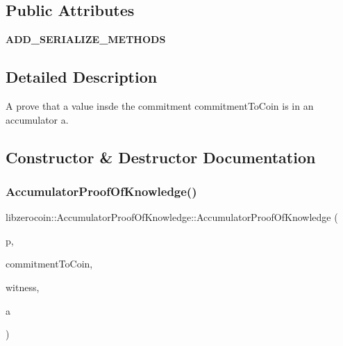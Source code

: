 \subsection*{Public Attributes}
\begin{DoxyCompactItemize}
\item 
\mbox{\label{classlibzerocoin_1_1_accumulator_proof_of_knowledge_aeebe0feccb9cc047063f279a369f0161}} 
{\bfseries A\+D\+D\+\_\+\+S\+E\+R\+I\+A\+L\+I\+Z\+E\+\_\+\+M\+E\+T\+H\+O\+DS}
\end{DoxyCompactItemize}


\subsection{Detailed Description}
A prove that a value insde the commitment commitment\+To\+Coin is in an accumulator a. 

\subsection{Constructor \& Destructor Documentation}
\mbox{\label{classlibzerocoin_1_1_accumulator_proof_of_knowledge_acce987e79e2498918495c3a7e8873810}} 
\subsubsection{\texorpdfstring{AccumulatorProofOfKnowledge()}{AccumulatorProofOfKnowledge()}}
{\footnotesize\ttfamily libzerocoin\+::\+Accumulator\+Proof\+Of\+Knowledge\+::\+Accumulator\+Proof\+Of\+Knowledge (\begin{DoxyParamCaption}\item[{const \mbox{\hyperlink{classlibzerocoin_1_1_accumulator_and_proof_params}{Accumulator\+And\+Proof\+Params}} $\ast$}]{p,  }\item[{const \mbox{\hyperlink{classlibzerocoin_1_1_commitment}{Commitment}} \&}]{commitment\+To\+Coin,  }\item[{const \mbox{\hyperlink{classlibzerocoin_1_1_accumulator_witness}{Accumulator\+Witness}} \&}]{witness,  }\item[{\mbox{\hyperlink{classlibzerocoin_1_1_accumulator}{Accumulator}} \&}]{a }\end{DoxyParamCaption})}

